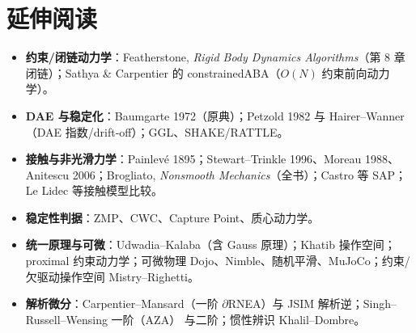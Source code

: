 \section*{延伸阅读}
\begin{itemize}
  \item \textbf{约束/闭链动力学}：Featherstone, \emph{Rigid Body Dynamics Algorithms}\cite{featherstone2008rigid}（第 8 章闭链）；Sathya \& Carpentier 的 constrainedABA\cite{sathya2024constrained}（$O(N)$ 约束前向动力学）。
  \item \textbf{DAE 与稳定化}：Baumgarte 1972\cite{baumgarte1972stabilization}（原典）；Petzold 1982\cite{petzold1982dae} 与 Hairer--Wanner\cite{hairer1996solving}（DAE 指数/drift-off）；GGL\cite{gear1985automatic}、SHAKE/RATTLE\cite{ryckaert1977numerical,andersen1983rattle}。
  \item \textbf{接触与非光滑力学}：Painlevé 1895\cite{painleve1895lois}；Stewart--Trinkle 1996\cite{stewart1996implicit}、Moreau 1988\cite{moreau1988unilateral}、Anitescu 2006\cite{anitescu2006optimization}；Brogliato, \emph{Nonsmooth Mechanics}\cite{brogliato2016nonsmooth}（全书）；Castro 等 SAP\cite{castro2021unconstrained}；Le Lidec 等接触模型比较\cite{lelidec2024contact}。
  \item \textbf{稳定性判据}：ZMP\cite{vukobratovic1972stability}、CWC\cite{caron2015stability}、Capture Point\cite{pratt2006capture}、质心动力学\cite{orin2013centroidal}。
  \item \textbf{统一原理与可微}：Udwadia--Kalaba\cite{udwadia1992new}（含 Gauss 原理）；Khatib 操作空间\cite{khatib1987unified}；proximal 约束动力学\cite{carpentier2021proximal}；可微物理 Dojo\cite{howell2022dojo}、Nimble\cite{werling2021fast}、随机平滑\cite{suh2022differentiable}、MuJoCo\cite{todorov2014convex}；约束/欠驱动操作空间 Mistry--Righetti\cite{mistry2012operational}。
  \item \textbf{解析微分}：Carpentier--Mansard\cite{carpentier2018analytical}（一阶 $\partial$RNEA）与 JSIM 解析逆\cite{carpentier2018inverse}；Singh--Russell--Wensing 一阶（AZA）\cite{singh2021efficient} 与二阶\cite{singh2022second}；惯性辨识 Khalil--Dombre\cite{khalil2002modeling}。
\end{itemize}



